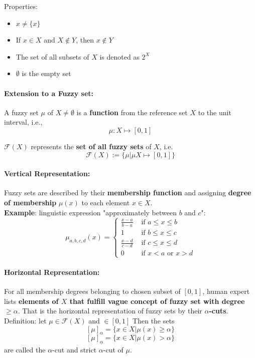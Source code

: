 \documentclass[11pt]{article}
\begin{document}
		Properties: 
		\begin{itemize}
			\item $x \neq \{x\}$
			\item If $x \in X$ and $X \notin Y$, then $x \notin Y$
			\item The set of all subsets of $X$ is denoted as $2^X$
			\item $\emptyset$ is the empty set
		\end{itemize}
		
		\paragraph{Extension to a Fuzzy set:} A fuzzy set $\mu$ of $X \neq \emptyset$ is a \textbf{function} from the reference set $X$ to the unit interval, i.e., $$\mu: X \mapsto [0,1]$$
		
		$\mathcal{F}(X)$ represents the \textbf{set of all fuzzy sets} of $X$, i.e.
		$$ \mathcal{F}(X) := \{\mu | \mu X \mapsto [0,1] \} $$
		
		\paragraph{Vertical Representation:} Fuzzy sets are described by their \textbf{membership function} and assigning \textbf{degree of membership} $\mu (x)$ to each element $x \in X$.\\
		
		\textbf{Example}: linguistic expression "approximately between $b$ and $c$": 
		$$ \mu_{a,b,c,d} (x) = \begin{cases}
			\frac{x - a}{b - a} & \text{ if } a \leq x \leq b \\
			1 & \text{ if } b \leq x \leq c \\
			\frac{x - d}{c - d} & \text{ if } c \leq x \leq d \\
			0 & \text{ if } x < a \text{ or } x > d
		\end{cases}$$
		
		\newpage
		
		\paragraph{Horizontal Representation:} For all membership degrees belonging to chosen subset of $[0,1]$, human expert lists \textbf{elements of $X$ that fulfill vague concept of fuzzy set with degree} $\geq \alpha$. That is the horizontal representation of fuzzy sets by their \textbf{$\alpha$-cuts}. Definition: let $\mu \in \mathcal{F}(X)$ and $\in [0,1]$ Then the sets
		$$ [\mu]_\alpha = \{x \in X | \mu (x) \geq \alpha \} $$
		$$ [\mu]_{\underline{\alpha}} = \{x \in X | \mu (x) > \alpha \}$$
		are called the $\alpha$-cut and strict $\alpha$-cut of $\mu$.\\
		
\end{document}
